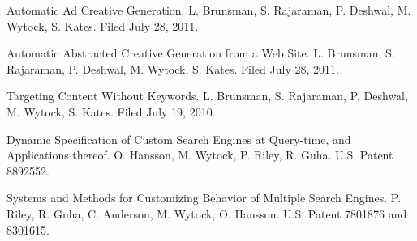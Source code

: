 \documentclass[margin, line]{res}
\begin{document}
\begin{resume}
Automatic Ad Creative Generation. L. Brunsman, S. Rajaraman, P. Deshwal,
M. Wytock, S. Kates. Filed July 28, 2011.

Automatic Abstracted Creative Generation from a Web Site. L. Brunsman,
S. Rajaraman, P. Deshwal, M. Wytock, S. Kates. Filed July 28, 2011.

Targeting Content Without Keywords. L. Brunsman, S. Rajaraman, P. Deshwal,
M. Wytock, S. Kates. Filed July 19, 2010.

Dynamic Specification of Custom Search Engines at Query-time, and Applications
thereof. O. Hansson, M. Wytock, P. Riley, R. Guha. U.S. Patent 8892552.

Systems and Methods for Customizing Behavior of Multiple Search
Engines. P. Riley, R. Guha, C. Anderson, M. Wytock, O. Hansson. U.S. Patent 7801876 and 8301615.

\end{resume}
\end{document}
